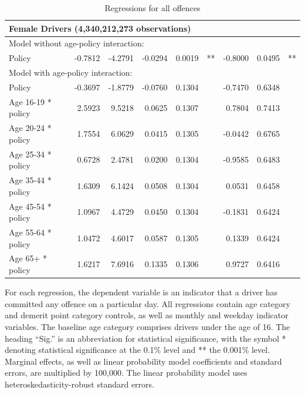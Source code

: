 \documentclass{cje}
\begin{document}
\begin{table}
\begin{tabular}{l r r r r l r r l}
\hline 

\multicolumn{8}{l}{\textbf{Female Drivers} (4,340,212,273 observations)} \\ 

\hline
\multicolumn{8}{l}{Model without age-policy interaction: } \\ 
Policy                   &  -0.7812        &  -4.2791       &  -0.0294        &  0.0019       &   **       &  -0.8000        &  0.0495       &   **       \\ 
\hline
\multicolumn{8}{l}{Model with age-policy interaction: } \\ 
Policy                   &  -0.3697        &  -1.8779       &  -0.0760        &  0.1304       &            &  -0.7470        &  0.6348       &            \\ 
Age 16-19 * policy   &  2.5923        &  9.5218       &  0.0625        &  0.1307       &            &  0.7804        &  0.7413       &            \\ 
Age 20-24 * policy   &  1.7554        &  6.0629       &  0.0415        &  0.1305       &            &  -0.0442        &  0.6765       &            \\ 
Age 25-34 * policy   &  0.6728        &  2.4781       &  0.0200        &  0.1304       &            &  -0.9585        &  0.6483       &            \\ 
Age 35-44 * policy   &  1.6309        &  6.1424       &  0.0508        &  0.1304       &            &  0.0531        &  0.6458       &            \\ 
Age 45-54 * policy   &  1.0967        &  4.4729       &  0.0450        &  0.1304       &            &  -0.1831        &  0.6424       &            \\ 
Age 55-64 * policy   &  1.0472        &  4.6017       &  0.0587        &  0.1305       &            &  0.1339        &  0.6424       &            \\ 
Age 65+ * policy   &  1.6217        &  7.6916       &  0.1335        &  0.1306       &            &  0.9727        &  0.6416       &            \\ 

\hline 

\end{tabular} 
\caption{Regressions for all offences} 
For each regression, the dependent variable is an indicator that a driver has committed  
any offence on a particular day.  
All regressions contain age category and demerit point category controls, 
as well as monthly and weekday indicator variables. 
The baseline age category comprises drivers under the age of 16. 
The heading ``Sig.'' is an abbreviation for statistical significance, with 
the symbol * denoting statistical significance at the 0.1\% level 
and ** the 0.001\% level. 
Marginal effects, as well as linear probability model coefficients and standard errors, are  
multiplied by 100,000.  
The linear probability model uses heteroskedasticity-robust standard errors. 
\label{tab:seas_Logit_vs_LPMx100K_regs} 
\end{table} 
 
\end{document}
